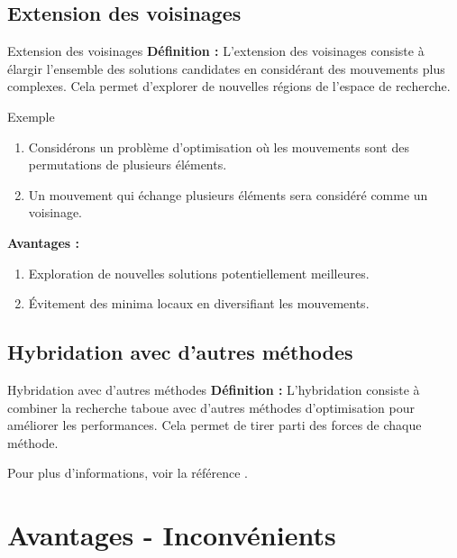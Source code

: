 \documentclass[10pt, handout]{beamer}
\begin{document}
\subsection{Extension des voisinages}
\begin{frame}{Extension des voisinages}
    \textbf{Définition :} 
    L'extension des voisinages consiste à élargir l'ensemble des solutions candidates en considérant des mouvements plus complexes. Cela permet d'explorer de nouvelles régions de l'espace de recherche.
    
    \bigskip

    \begin{exampleblock}{Exemple}
        \begin{enumerate}
            \item Considérons un problème d'optimisation où les mouvements sont des permutations
                  de plusieurs éléments.
            \item Un mouvement qui échange plusieurs éléments sera considéré comme un voisinage.
        \end{enumerate}
    \end{exampleblock}
    \bigskip
    \textbf{Avantages :}
    \begin{enumerate}
        \item Exploration de nouvelles solutions potentiellement meilleures.
        \item Évitement des minima locaux en diversifiant les mouvements.
    \end{enumerate}
\end{frame}

\subsection{Hybridation avec d'autres méthodes}
\begin{frame}{Hybridation avec d'autres méthodes}
    \textbf{Définition :}
    L'hybridation consiste à combiner la recherche taboue avec d'autres méthodes d'optimisation pour améliorer les performances. Cela permet de tirer parti des forces de chaque méthode.

    \bigskip

    Pour plus d'informations, voir la référence \cite{ref1}.
\end{frame}

\section{Avantages - Inconvénients}
\end{document}
